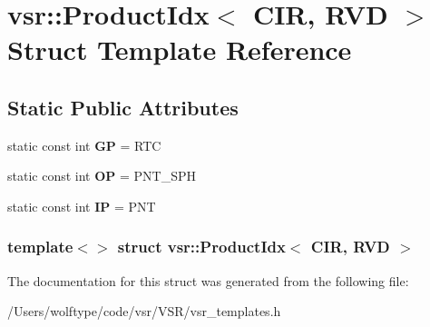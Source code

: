 \hypertarget{structvsr_1_1_product_idx_3_01_c_i_r_00_01_r_v_d_01_4}{\section{vsr\-:\-:Product\-Idx$<$ C\-I\-R, R\-V\-D $>$ Struct Template Reference}
\label{structvsr_1_1_product_idx_3_01_c_i_r_00_01_r_v_d_01_4}
}
\subsection*{Static Public Attributes}
\begin{DoxyCompactItemize}
\item 
\hypertarget{structvsr_1_1_product_idx_3_01_c_i_r_00_01_r_v_d_01_4_a0a91b5ba13cd0422ae79720b62446b9a}{static const int {\bfseries G\-P} = R\-T\-C}\label{structvsr_1_1_product_idx_3_01_c_i_r_00_01_r_v_d_01_4_a0a91b5ba13cd0422ae79720b62446b9a}

\item 
\hypertarget{structvsr_1_1_product_idx_3_01_c_i_r_00_01_r_v_d_01_4_a1e4ca21f131b60e582db564eded999f4}{static const int {\bfseries O\-P} = P\-N\-T\-\_\-\-S\-P\-H}\label{structvsr_1_1_product_idx_3_01_c_i_r_00_01_r_v_d_01_4_a1e4ca21f131b60e582db564eded999f4}

\item 
\hypertarget{structvsr_1_1_product_idx_3_01_c_i_r_00_01_r_v_d_01_4_a5cb1f9e81f852b3e6e2fe2d5bb1b427a}{static const int {\bfseries I\-P} = P\-N\-T}\label{structvsr_1_1_product_idx_3_01_c_i_r_00_01_r_v_d_01_4_a5cb1f9e81f852b3e6e2fe2d5bb1b427a}

\end{DoxyCompactItemize}
\subsubsection*{template$<$$>$ struct vsr\-::\-Product\-Idx$<$ C\-I\-R, R\-V\-D $>$}



The documentation for this struct was generated from the following file\-:\begin{DoxyCompactItemize}
\item 
/\-Users/wolftype/code/vsr/\-V\-S\-R/vsr\-\_\-templates.\-h\end{DoxyCompactItemize}
